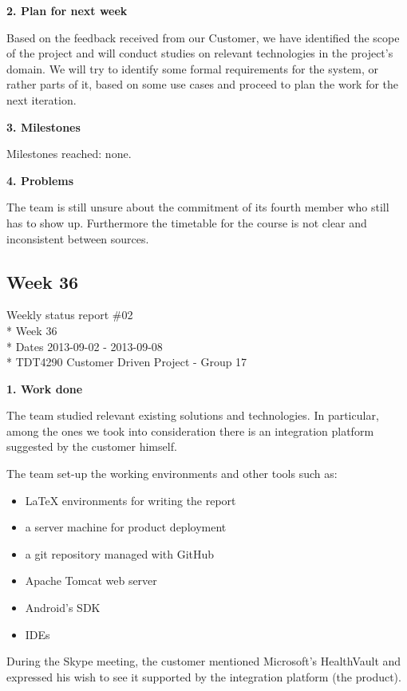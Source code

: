 \textbf{2. Plan for next week}

Based on the feedback received from our Customer, we have identified the scope of the project and will conduct studies on relevant technologies in the project’s domain. We will try to identify some formal requirements
for the system, or rather parts of it, based on some use cases and proceed to plan the work for the next iteration.

\textbf{3. Milestones}

Milestones reached: none.

\textbf{4. Problems}

The team is still unsure about the commitment of its fourth member
who still has to show up. Furthermore the timetable for the course
is not clear and inconsistent between sources.

\newpage
\subsection{Week 36}

\begin{center}
Weekly status report \#02\\*
Week 36 \\*
Dates 2013-09-02 - 2013-09-08 \\*
TDT4290 Customer Driven Project - Group 17
\end{center}

\textbf{1. Work done}

The team studied relevant existing solutions and technologies.
In particular, among the ones we took into consideration there is an integration platform suggested by the customer himself.

The team set-up the working environments and other tools such as:
\begin{itemize}
\item LaTeX environments for writing the report
\item a server machine for product deployment
\item a git repository managed with GitHub
\item Apache Tomcat web server
\item Android’s SDK
\item IDEs
\end{itemize}

During the Skype meeting, the customer mentioned Microsoft’s  HealthVault and expressed his wish to
see it supported by the integration platform (the product).

